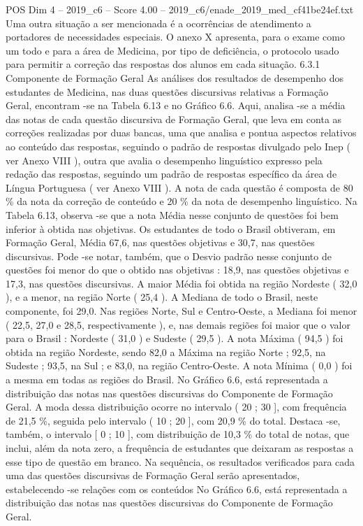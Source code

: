 \begin{textsample}{POS Dim 4 – 2019\_c6 – Score 4.00 – 2019\_c6/enade\_2019\_med\_cf41be24ef.txt}
Uma outra situação a ser mencionada é a ocorrências de atendimento a portadores de necessidades especiais.
O anexo X apresenta, para o exame como um todo e para a área de Medicina, por tipo de deficiência, o protocolo usado para permitir a correção das respostas dos alunos em cada situação. 6.3.1 Componente de Formação Geral As análises dos resultados de desempenho dos estudantes de Medicina, nas duas questões discursivas relativas a Formação Geral, encontram -se na Tabela 6.13 e no Gráfico 6.6.
Aqui, analisa -se a média das notas de cada questão discursiva de Formação Geral, que leva em conta as correções realizadas por duas bancas, uma que analisa e pontua aspectos relativos ao conteúdo das respostas, seguindo o padrão de respostas divulgado pelo Inep ( ver Anexo VIII ), outra que avalia o desempenho linguístico expresso pela redação das respostas, seguindo um padrão de respostas específico da área de Língua Portuguesa ( ver Anexo VIII ).
A nota de cada questão é composta de 80 \% da nota da correção de conteúdo e 20 \% da nota de desempenho linguístico.
Na Tabela 6.13, observa -se que a nota Média nesse conjunto de questões foi bem inferior à obtida nas objetivas.
Os estudantes de todo o Brasil obtiveram, em Formação Geral, Média 67,6, nas questões objetivas e 30,7, nas questões discursivas.
Pode -se notar, também, que o Desvio padrão nesse conjunto de questões foi menor do que o obtido nas objetivas : 18,9, nas questões objetivas e 17,3, nas questões discursivas.
A maior Média foi obtida na região Nordeste ( 32,0 ), e a menor, na região Norte ( 25,4 ).
A Mediana de todo o Brasil, neste componente, foi 29,0.
Nas regiões Norte, Sul e Centro-Oeste, a Mediana foi menor ( 22,5, 27,0 e 28,5, respectivamente ), e, nas demais regiões foi maior que o valor para o Brasil : Nordeste ( 31,0 ) e Sudeste ( 29,5 ).
A nota Máxima ( 94,5 ) foi obtida na região Nordeste, sendo 82,0 a Máxima na região Norte ; 92,5, na Sudeste ; 93,5, na Sul ; e 83,0, na região Centro-Oeste.
A nota Mínima ( 0,0 ) foi a mesma em todas as regiões do Brasil.
No Gráfico 6.6, está representada a distribuição das notas nas questões discursivas do Componente de Formação Geral.
A moda dessa distribuição ocorre no intervalo ( 20 ; 30 ], com frequência de 21,5 \%, seguida pelo intervalo ( 10 ; 20 ], com 20,9 \% do total.
Destaca -se, também, o intervalo [ 0 ; 10 ], com distribuição de 10,3 \% do total de notas, que inclui, além da nota zero, a frequência de estudantes que deixaram as respostas a esse tipo de questão em branco.
Na sequência, os resultados verificados para cada uma das questões discursivas de Formação Geral serão apresentados, estabelecendo -se relações com os conteúdos No Gráfico 6.6, está representada a distribuição das notas nas questões discursivas do Componente de Formação Geral.

\end{textsample}
